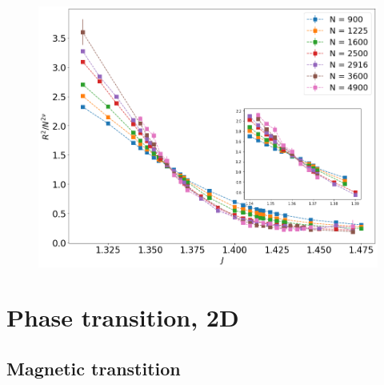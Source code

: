 \documentclass{beamer}
\begin{document}
\begin{frame}
\begin{minipage}{0.48\linewidth}
	\end{minipage}%
	\hfill
	\begin{minipage}{0.48\linewidth}
		\begin{figure}[h]
			\centering
			\includegraphics[scale=0.1822]{rscaling_longchains.png} 
			\label{ph}
		\end{figure}
	\end{minipage}
\end{frame}


\section{Phase transition, 2D }
\subsection{Magnetic transtition }
\end{document}
